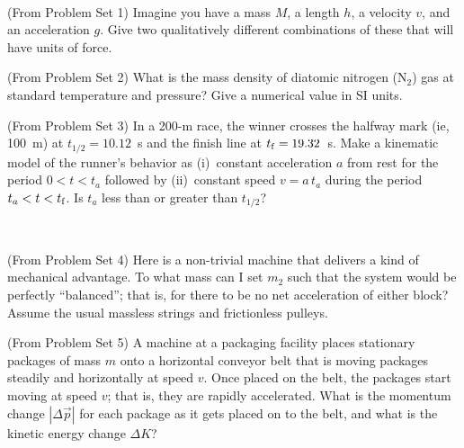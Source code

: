 \documentclass[12pt, letterpaper]{article}
\begin{document}
\vfill
~\clearpage

\begin{problem} (From Problem Set 1)
Imagine you have a mass $M$, a length $h$, a velocity $v$, and an
acceleration $g$. Give two qualitatively different combinations of these
that will have units of force.
\end{problem}

\vfill

\begin{problem} (From Problem Set 2)
  What is the mass density of diatomic nitrogen ($\mathrm{N}_2$) gas at standard
  temperature and pressure? Give a numerical value in SI units.
\end{problem}

\vfill

\begin{problem} (From Problem Set 3)
  In a 200-m race, the winner crosses the halfway mark (ie, 100~m) at
  $t_{1/2}=10.12$~s and the finish line at $t_{\rm f}=19.32$~s.
  Make a kinematic model of the runner's behavior as (i)~constant
  acceleration $a$ from rest for the period $0<t<t_a$ followed by
  (ii)~constant speed $v=a\,t_a$ during the period $t_a<t<t_{\rm f}$.
  Is $t_a$ less than or greater than $t_{1/2}$?
\end{problem}

\vfill
~\clearpage

\begin{problem} (From Problem Set 4)
  Here is a non-trivial machine that delivers a kind of mechanical
  advantage. To what mass can I set $m_2$ such that the system would
  be perfectly ``balanced''; that is, for there to be no
  net acceleration of either block?
  Assume the usual massless strings and frictionless pulleys.
\end{problem}

\vfill

\begin{problem} (From Problem Set 5)
  A machine at a packaging facility places stationary packages of mass
  $m$ onto a horizontal conveyor belt that is moving packages steadily
  and horizontally at speed $v$. Once placed on the belt, the packages
  start moving at speed $v$; that is, they are rapidly accelerated.
  What is the momentum change $|\Delta \vec{p}|$ for each package as it
  gets placed on to the belt, and what is the kinetic energy change $\Delta K$?
\end{problem}
\end{document}
